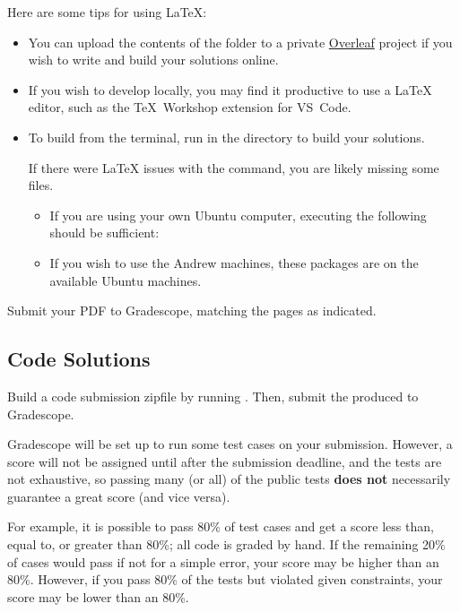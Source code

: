 \documentclass[11pt]{article}
\begin{document}
Here are some tips for using \LaTeX{}:
\begin{itemize}
  \item
    You can upload the contents of the  folder to a private \href{https://www.overleaf.com/}{Overleaf} project if you wish to write and build your solutions online.

  \item
    If you wish to develop locally, you may find it productive to use a \LaTeX{} editor, such as the TeX~Workshop extension for VS~Code.

  \item
    To build from the terminal, run  in the  directory to build your solutions.

    If there were LaTeX issues with the  command, you are likely missing some  files.
    \begin{itemize}
      \item
        If you are using your own Ubuntu computer, executing the following should be sufficient:

      \item
        If you wish to use the Andrew machines, these packages are on the available Ubuntu machines.

    \end{itemize}
\end{itemize}

Submit your PDF to Gradescope, matching the pages as indicated.

\subsection{Code Solutions}

Build a code submission zipfile by running .
Then, submit the produced  to Gradescope.

Gradescope will be set up to run some test cases on your submission.
However, a score will not be assigned until after the submission deadline, and the tests are not exhaustive, so passing many (or all) of the public tests \textbf{does not} necessarily guarantee a great score (and vice versa).

For example, it is possible to pass 80\% of test cases and get a score less than, equal to, or greater than 80\%; all code is graded by hand.
If the remaining 20\% of cases would pass if not for a simple error, your score may be higher than an 80\%.
However, if you pass 80\% of the tests but violated given constraints, your score may be lower than an 80\%.
\end{document}
